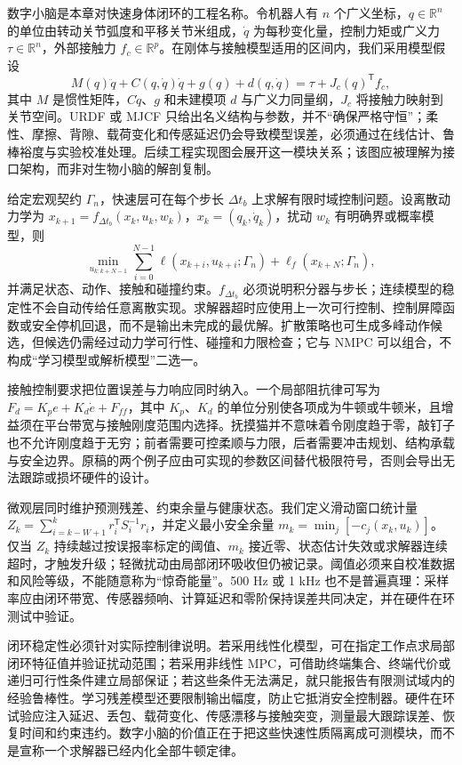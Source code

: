 数字小脑是本章对快速身体闭环的工程名称。令机器人有 $n$ 个广义坐标，$q\in\mathbb{R}^{n}$ 的单位由转动关节弧度和平移关节米组成，$\dot q$ 为每秒变化量，控制力矩或广义力 $\tau\in\mathbb{R}^{n}$，外部接触力 $f_c\in\mathbb{R}^{p}$。在刚体与接触模型适用的区间内，我们采用模型假设
\begin{equation}
 M(q)\ddot q+C(q,\dot q)\dot q+g(q)+d(q,\dot q)=\tau+J_c(q)^\mathsf{T}f_c,
\end{equation}
其中 $M$ 是惯性矩阵，$C\dot q$、$g$ 和未建模项 $d$ 与广义力同量纲，$J_c$ 将接触力映射到关节空间。URDF 或 MJCF 只给出名义结构与参数，并不“确保严格守恒”；柔性、摩擦、背隙、载荷变化和传感延迟仍会导致模型误差，必须通过在线估计、鲁棒裕度与实验校准处理。后续工程实现图会展开这一模块关系；该图应被理解为接口架构，而非对生物小脑的解剖复制。

给定宏观契约 $\Gamma_n$，快速层可在每个步长 $\Delta t_b$ 上求解有限时域控制问题。设离散动力学为 $x_{k+1}=f_{\Delta t_b}(x_k,u_k,w_k)$，$x_k=(q_k,\dot q_k)$，扰动 $w_k$ 有明确界或概率模型，则
\begin{equation}
 \min_{u_{k:k+N-1}}\sum_{i=0}^{N-1}\ell(x_{k+i},u_{k+i};\Gamma_n)+\ell_f(x_{k+N};\Gamma_n),
\end{equation}
并满足状态、动作、接触和碰撞约束。$f_{\Delta t_b}$ 必须说明积分器与步长；连续模型的稳定性不会自动传给任意离散实现。求解器超时应使用上一次可行控制、控制屏障函数或安全停机回退，而不是输出未完成的最优解。扩散策略也可生成多峰动作候选，但候选仍需经过动力学可行性、碰撞和力限检查；它与 NMPC 可以组合，不构成“学习模型或解析模型”二选一。

接触控制要求把位置误差与力响应同时纳入。一个局部阻抗律可写为 $F_d=K_pe+K_d\dot e+F_{ff}$，其中 $K_p$、$K_d$ 的单位分别使各项成为牛顿或牛顿米，且增益须在平台带宽与接触刚度范围内选择。抚摸猫并不意味着令刚度趋于零，敲钉子也不允许刚度趋于无穷；前者需要可控柔顺与力限，后者需要冲击规划、结构承载与安全边界。原稿的两个例子应由可实现的参数区间替代极限符号，否则会导出无法跟踪或损坏硬件的设计。

微观层同时维护预测残差、约束余量与健康状态。我们定义滑动窗口统计量 $Z_k=\sum_{i=k-W+1}^{k}r_i^\mathsf{T}S_i^{-1}r_i$，并定义最小安全余量 $m_k=\min_j[-c_j(x_k,u_k)]$。仅当 $Z_k$ 持续越过按误报率标定的阈值、$m_k$ 接近零、状态估计失效或求解器连续超时，才触发升级；轻微扰动由局部闭环吸收但仍被记录。阈值必须来自校准数据和风险等级，不能随意称为“惊奇能量”。500 Hz 或 1 kHz 也不是普遍真理：采样率应由闭环带宽、传感器频响、计算延迟和零阶保持误差共同决定，并在硬件在环测试中验证。

闭环稳定性必须针对实际控制律说明。若采用线性化模型，可在指定工作点求局部闭环特征值并验证扰动范围；若采用非线性 MPC，可借助终端集合、终端代价或递归可行性条件建立局部保证；若这些条件无法满足，就只能报告有限测试域内的经验鲁棒性。学习残差模型还要限制输出幅度，防止它抵消安全控制器。硬件在环试验应注入延迟、丢包、载荷变化、传感漂移与接触突变，测量最大跟踪误差、恢复时间和约束违约。数字小脑的价值正在于把这些快速性质隔离成可测模块，而不是宣称一个求解器已经内化全部牛顿定律。

